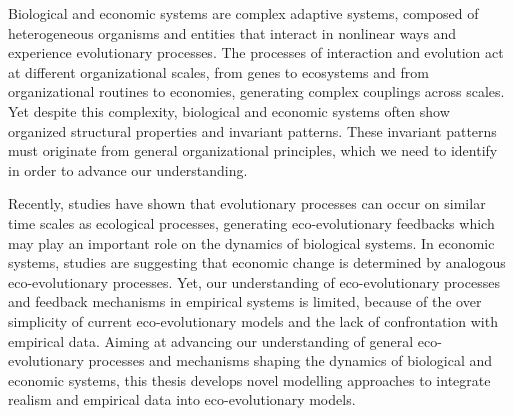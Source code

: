 %
\label{sec:summary}

Biological and economic systems are complex adaptive systems, composed of heterogeneous organisms and entities that interact in nonlinear ways and experience evolutionary processes.
% 
The processes of interaction and evolution act at different organizational scales, from genes to ecosystems and from organizational routines to economies, generating complex couplings across scales. Yet despite this complexity, biological and economic systems often show organized structural properties and invariant patterns. 
% 
%
These invariant patterns must originate from general organizational principles, which we need to identify in order to advance our understanding.

Recently, studies have shown that evolutionary processes can occur on similar time scales as ecological processes, generating eco-evolutionary feedbacks which may play an important role on the dynamics of biological systems. %
% 
In economic systems, studies are suggesting that economic change is determined by analogous eco-evolutionary processes. 
Yet, our understanding of eco-evolutionary processes and feedback mechanisms in empirical systems is limited, because of the over simplicity of current eco-evolutionary models and the lack of confrontation with empirical data. %
% 
% 
% 
Aiming at advancing our understanding of general eco-evolutionary processes and mechanisms shaping the dynamics of biological and economic systems, this thesis develops novel modelling approaches to integrate realism and empirical data into eco-evolutionary models.

